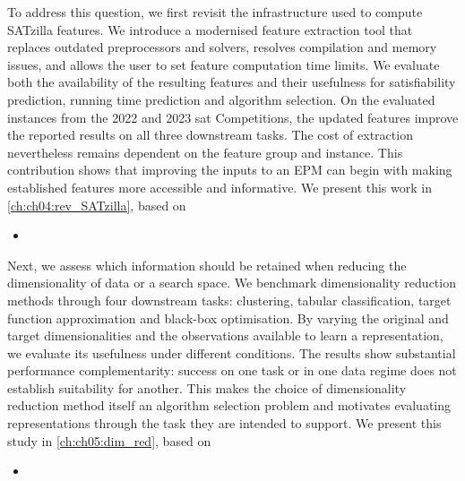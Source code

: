 To address this question, we first revisit the infrastructure used to compute SATzilla features. We introduce a modernised feature extraction tool that replaces outdated preprocessors and solvers, resolves compilation and memory issues, and allows the user to set feature computation time limits. We evaluate both the availability of the resulting features and their usefulness for satisfiability prediction, running time prediction and algorithm selection. On the evaluated instances from the 2022 and 2023 \gls{sat} Competitions, the updated features improve the reported results on all three downstream tasks. The cost of extraction nevertheless remains dependent on the feature group and instance. This contribution shows that improving the inputs to an EPM can begin with making established features more accessible and informative. We present this work in \cref{ch:ch04:rev_SATzilla}, based on
\begin{itemize}
    \item {}
\end{itemize}

Next, we assess which information should be retained when reducing the dimensionality of data or a search space. We benchmark dimensionality reduction methods through four downstream tasks: clustering, tabular classification, target function approximation and black-box optimisation. By varying the original and target dimensionalities and the observations available to learn a representation, we evaluate its usefulness under different conditions. The results show substantial performance complementarity: success on one task or in one data regime does not establish suitability for another. This makes the choice of dimensionality reduction method itself an algorithm selection problem and motivates evaluating representations through the task they are intended to support. We present this study in \cref{ch:ch05:dim_red}, based on
\begin{itemize}
    \item {}
\end{itemize}

